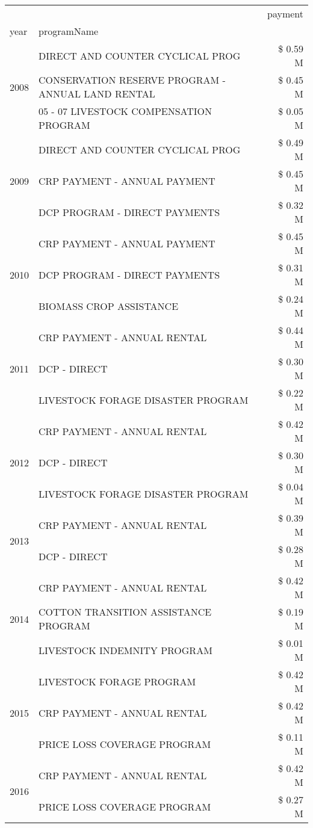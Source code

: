 \begin{tabular}{llr}
\toprule
 &  & payment \\
year & programName &  \\
\midrule
\multirow[t]{3}{*}{2008} & DIRECT AND COUNTER CYCLICAL PROG & \$ 0.59 M \\
 & CONSERVATION RESERVE PROGRAM - ANNUAL LAND RENTAL & \$ 0.45 M \\
 & 05 - 07 LIVESTOCK COMPENSATION PROGRAM & \$ 0.05 M \\
\cline{1-3}
\multirow[t]{3}{*}{2009} & DIRECT AND COUNTER CYCLICAL PROG & \$ 0.49 M \\
 & CRP PAYMENT - ANNUAL PAYMENT & \$ 0.45 M \\
 & DCP PROGRAM - DIRECT PAYMENTS & \$ 0.32 M \\
\cline{1-3}
\multirow[t]{3}{*}{2010} & CRP PAYMENT - ANNUAL PAYMENT & \$ 0.45 M \\
 & DCP PROGRAM - DIRECT PAYMENTS & \$ 0.31 M \\
 & BIOMASS CROP ASSISTANCE & \$ 0.24 M \\
\cline{1-3}
\multirow[t]{3}{*}{2011} & CRP PAYMENT - ANNUAL RENTAL & \$ 0.44 M \\
 & DCP - DIRECT & \$ 0.30 M \\
 & LIVESTOCK FORAGE DISASTER PROGRAM & \$ 0.22 M \\
\cline{1-3}
\multirow[t]{3}{*}{2012} & CRP PAYMENT - ANNUAL RENTAL & \$ 0.42 M \\
 & DCP - DIRECT & \$ 0.30 M \\
 & LIVESTOCK FORAGE DISASTER PROGRAM & \$ 0.04 M \\
\cline{1-3}
\multirow[t]{2}{*}{2013} & CRP PAYMENT - ANNUAL RENTAL & \$ 0.39 M \\
 & DCP - DIRECT & \$ 0.28 M \\
\cline{1-3}
\multirow[t]{3}{*}{2014} & CRP PAYMENT - ANNUAL RENTAL & \$ 0.42 M \\
 & COTTON TRANSITION ASSISTANCE PROGRAM & \$ 0.19 M \\
 & LIVESTOCK INDEMNITY PROGRAM & \$ 0.01 M \\
\cline{1-3}
\multirow[t]{3}{*}{2015} & LIVESTOCK FORAGE PROGRAM & \$ 0.42 M \\
 & CRP PAYMENT - ANNUAL RENTAL & \$ 0.42 M \\
 & PRICE LOSS COVERAGE PROGRAM & \$ 0.11 M \\
\cline{1-3}
\multirow[t]{3}{*}{2016} & CRP PAYMENT - ANNUAL RENTAL & \$ 0.42 M \\
 & PRICE LOSS COVERAGE PROGRAM & \$ 0.27 M \\

\end{tabular}
